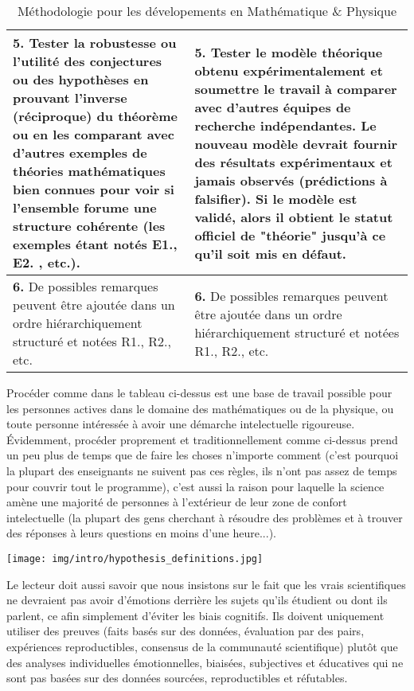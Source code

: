 \begin{table}[H]
\begin{center}
\begin{tabular}{|p{7.5cm}|p{7.5cm}|}
				\textbf{5.} Tester la robustesse ou l'utilité des conjectures ou des hypothèses en prouvant l'inverse (réciproque) du théorème ou en les comparant avec d'autres exemples de théories mathématiques bien connues pour voir si l'ensemble forume une structure cohérente (les exemples étant notés E1., E2. , etc.). & \textbf{5.} Tester le modèle théorique obtenu expérimentalement  et soumettre le travail à comparer avec d'autres équipes de recherche indépendantes. Le nouveau modèle devrait fournir des résultats expérimentaux et jamais observés (prédictions à falsifier). Si le modèle est validé, alors il obtient le statut officiel de "théorie" jusqu'à ce qu'il soit mis en défaut. \\ \hline
				\textbf{6.} De possibles remarques peuvent être ajoutée dans un ordre hiérarchiquement structuré et notées R1., R2., etc. & \textbf{6.} De possibles remarques peuvent être ajoutée dans un ordre hiérarchiquement structuré et notées R1., R2., etc.			
				\\ \hline
		\end{tabular}
	\end{center}
	\caption{Méthodologie pour les dévelopements en Mathématique \& Physique}
	\end{table}	
	
	Procéder comme dans le tableau ci-dessus est une base de travail possible pour les personnes actives dans le domaine des mathématiques ou de la physique, ou toute personne intéressée à avoir une démarche intelectuelle rigoureuse. Évidemment, procéder proprement et traditionnellement comme ci-dessus prend un peu plus de temps que de faire les choses n'importe comment (c'est pourquoi la plupart des enseignants ne suivent pas ces règles, ils n'ont pas assez de temps pour couvrir tout le programme), c'est aussi la raison pour laquelle la science amène une majorité de personnes à l'extérieur de leur zone de confort intelectuelle (la plupart des gens cherchant à résoudre des problèmes et à trouver des réponses à leurs questions en moins d'une heure...).

\begin{center}
\texttt{[image: img/intro/hypothesis\_definitions.jpg]}
\end{center}
Le lecteur doit aussi savoir que nous insistons sur le fait que les vrais scientifiques ne devraient pas avoir d'émotions derrière les sujets qu'ils étudient ou dont ils parlent, ce afin simplement d'éviter les biais cognitifs. Ils doivent uniquement utiliser des preuves (faits basés sur des données, évaluation par des pairs, expériences reproductibles, consensus de la communauté scientifique) plutôt que des analyses individuelles émotionnelles, biaisées, subjectives et éducatives qui ne sont pas basées sur des données sourcées, reproductibles et réfutables.

